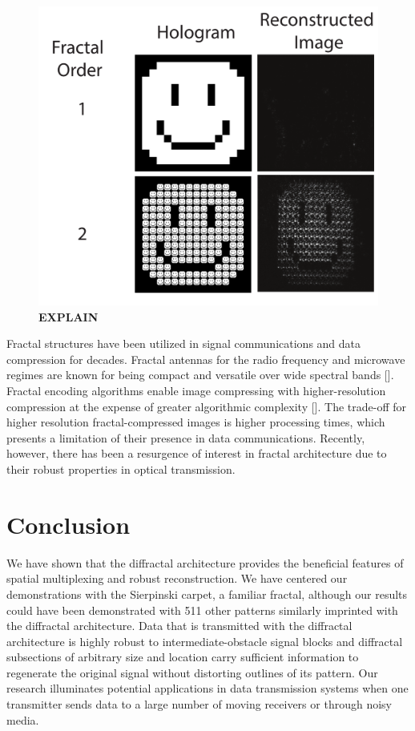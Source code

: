 \begin{figure}[h!]
\includegraphics[width=\textwidth]{imgRecon.pdf}
\caption[]{\textbf{EXPLAIN}}
\label{face}
\end{figure}

Fractal structures have been utilized in signal communications and data compression for decades. Fractal antennas for the radio frequency and microwave regimes are known for being compact and versatile over wide spectral bands [\cite{Radonic,Puente-Baliarda}]. Fractal encoding algorithms enable image compressing with higher-resolution compression at the expense of greater algorithmic complexity [\cite{Jacquin}]. The trade-off for higher resolution fractal-compressed images is higher processing times, which presents a limitation of their presence in data communications. Recently, however, there has been a resurgence of interest in fractal architecture due to their robust properties in optical transmission.

\section{Conclusion}
We have shown that the diffractal architecture provides the beneficial features of spatial multiplexing and robust reconstruction. We have centered our demonstrations with the Sierpinski carpet, a familiar fractal, although our results could have been demonstrated with 511 other patterns similarly imprinted with the diffractal architecture. Data that is transmitted with the diffractal architecture is highly robust to intermediate-obstacle signal blocks and diffractal subsections of arbitrary size and location carry sufficient information to regenerate the original signal without distorting outlines of its pattern.  Our research illuminates potential applications in data transmission systems when one transmitter sends data to a large number of moving receivers or through noisy media.
